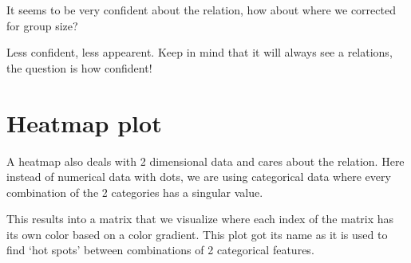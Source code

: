 \documentclass[letterpaper,10pt,english]{jupyterBook}
\begin{document}
\begin{sphinxVerbatim}[commandchars=\\\{\}]
    
\end{sphinxVerbatim}

\noindent{}

\sphinxAtStartPar
It seems to be very confident about the relation, how about where we corrected for group size?

\begin{sphinxVerbatim}[commandchars=\\\{\}]
    
\end{sphinxVerbatim}

\noindent{}

\sphinxAtStartPar
Less confident, less appearent.
Keep in mind that it will always see a relations, the question is how confident!


\chapter{Heatmap plot}
\label{\detokenize{c4_data_visualisation/heatmap:heatmap-plot}}\label{\detokenize{c4_data_visualisation/heatmap::doc}}
\sphinxAtStartPar
A heatmap also deals with 2 dimensional data and cares about the relation.
Here instead of numerical data with dots, we are using categorical data where every combination of the 2 categories has a singular value.

\sphinxAtStartPar
This results into a matrix that we visualize where each index of the matrix has its own color based on a color gradient.
This plot got its name as it is used to find ‘hot spots’ between combinations of 2 categorical features.

\begin{sphinxVerbatim}[commandchars=\\\{\}]
   
   
\end{sphinxVerbatim}
\end{document}
